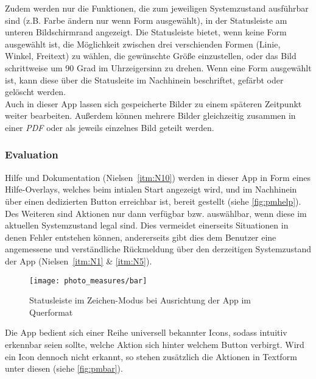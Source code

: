 Zudem werden nur die Funktionen, die zum jeweiligen Systemzustand ausführbar sind (z.B. Farbe ändern nur wenn Form ausgewählt), in der Statusleiste am unteren Bildschirmrand angezeigt.
Die Statusleiste bietet, wenn keine Form ausgewählt ist, die Möglichkeit zwischen drei verschienden Formen (Linie, Winkel, Freitext) zu wählen, die gewünschte Größe einzustellen, oder das Bild schrittweise um 90 Grad im Uhrzeigersinn zu drehen.
Wenn eine Form ausgewählt ist, kann diese über die Statusleite im Nachhinein beschriftet, gefärbt oder gelöscht werden. \\

Auch in dieser App lassen sich gespeicherte Bilder zu einem späteren Zeitpunkt weiter bearbeiten.
Außerdem können mehrere Bilder gleichzeitig zusammen in einer \emph{PDF} oder als jeweils einzelnes Bild geteilt werden.

\subsubsection{Evaluation}\label{subsec:pmeva}

Hilfe und Dokumentation (Nielsen~\autoref{itm:N10}) werden in dieser App in Form eines Hilfe-Overlays, welches beim intialen Start angezeigt wird, und im Nachhinein über einen dedizierten Button erreichbar ist, bereit gestellt (siehe \autoref{fig:pmhelp}). \\

Des Weiteren sind Aktionen nur dann verfügbar bzw. auswählbar, wenn diese im aktuellen Systemzustand legal sind.
Dies vermeidet einerseits Situationen in denen Fehler entstehen können, andererseits gibt dies dem Benutzer eine angemessene und verständliche Rückmeldung über den derzeitigen Systemzustand der App (Nielsen~\autoref{itm:N1} \& \autoref{itm:N5}). \\

\begin{wrapfigure}{R}{0.4\textwidth}
  \centering
  \texttt{[image: photo\_measures/bar]}
  \caption{Statusleiste im Zeichen-Modus bei Ausrichtung der App im Querformat}
  \label{fig:pmbar}
\end{wrapfigure}

\noindent
Die App bedient sich einer Reihe universell bekannter Icons, sodass intuitiv erkennbar seien sollte, welche Aktion sich hinter welchem Button verbirgt.
Wird ein Icon dennoch nicht erkannt, so stehen zusätzlich die Aktionen in Textform unter diesen (siehe \autoref{fig:pmbar}). \\

